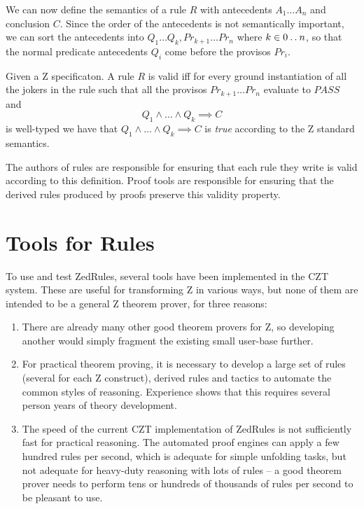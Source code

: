 \documentclass{entcs}
\begin{document}
We can now define the semantics of a rule $R$ with antecedents $A_1
\ldots A_n$ and conclusion $C$.  Since the order of the antecedents is
not semantically important, we can sort the antecedents into $Q_1
\ldots Q_k, Pr_{k+1} \ldots Pr_n$ where $k \in 0 \mathbin{\mathstrut{\ldotp\ldotp}} n$, so that the
normal predicate antecedents $Q_i$ come before the provisos $Pr_i$.
\begin{defn} %
  Given a Z specificaton.  A rule $R$ is valid iff for every ground
  instantiation of all the jokers in the rule such that
  all the provisos $Pr_{k+1} \ldots Pr_n$ evaluate to $PASS$ and
  \[
       Q_1 \land \ldots \land Q_k \implies C
  \]
  is well-typed we have that $Q_1 \land \ldots \land Q_k \implies C$
  is {\it true} according to the Z standard semantics.
\end{defn}

The authors of rules are responsible for ensuring that each rule they
write is valid according to this definition.  Proof tools are
responsible for ensuring that the derived rules produced by proofs
preserve this validity property.


\section{Tools for Rules} \label{sec:tools}

To use and test ZedRules, several tools have been implemented in the
CZT system.  These are useful for transforming Z in various ways, but
none of them are intended to be a general Z theorem prover, for three
reasons:
\begin{enumerate}
\item There are already many other good theorem provers for Z, so
  developing another would simply fragment the existing small
  user-base further.
\item For practical theorem proving, it is necessary to develop a large set
  of rules (several for each Z construct), derived rules and tactics to
  automate the common styles of reasoning.  Experience shows that this
  requires several person years of theory development. 
\item The speed of the current CZT implementation of ZedRules is not
  sufficiently fast for practical reasoning.  The automated proof engines can
  apply a few hundred rules per second, which is adequate for simple unfolding
  tasks, but not adequate for heavy-duty reasoning with lots of rules --
  a good theorem prover needs to perform tens or hundreds of thousands of
  rules per second to be pleasant to use.
\end{enumerate}
\end{document}
